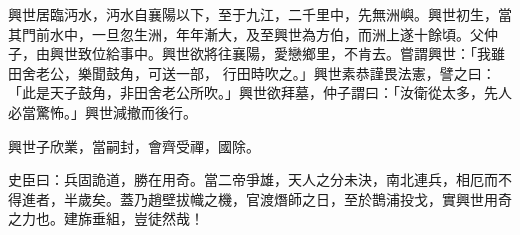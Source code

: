 \begin{pinyinscope}
 興世居臨沔水，沔水自襄陽以下，至于九江，二千里中，先無洲嶼。興世初生，當其門前水中，一旦忽生洲，年年漸大，及至興世為方伯，而洲上遂十餘頃。父仲子，由興世致位給事中。興世欲將往襄陽，愛戀鄉里，不肯去。嘗謂興世：「我雖田舍老公，樂聞鼓角，可送一部，
 行田時吹之。」興世素恭謹畏法憲，譬之曰：「此是天子鼓角，非田舍老公所吹。」興世欲拜墓，仲子謂曰：「汝衛從太多，先人必當驚怖。」興世減撤而後行。



 興世子欣業，當嗣封，會齊受禪，國除。



 史臣曰：兵固詭道，勝在用奇。當二帝爭雄，天人之分未決，南北連兵，相厄而不得進者，半歲矣。蓋乃趙壁拔幟之機，官渡熸師之日，至於鵲浦投戈，實興世用奇之力也。建旆垂組，豈徒然哉！



\end{pinyinscope}